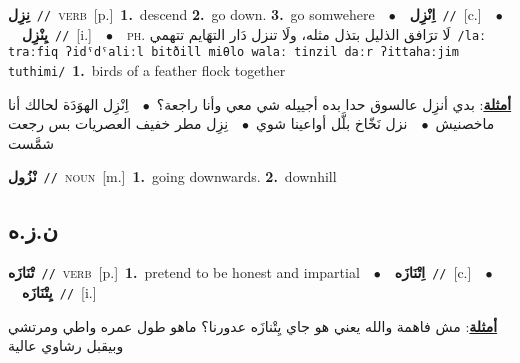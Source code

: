 \documentclass[10pt,a4paper,twoside]{article} %
\begin{document}
\begin{multicols}{2}
{\setlength\topsep{0pt}\textbf{\foreignlanguage{arabic}{نِزِل}}\ {\color{gray}\texttt{//}\color{black}}\ \textsc{verb}\ [p.]\ \textbf{1.}~descend  \textbf{2.}~go down.  \textbf{3.}~go somwehere\ \ $\bullet$\ \ \setlength\topsep{0pt}\textbf{\foreignlanguage{arabic}{اِنْزِل}}\ {\color{gray}\texttt{//}\color{black}}\ [c.]\ \ $\bullet$\ \ \setlength\topsep{0pt}\textbf{\foreignlanguage{arabic}{يِنْزِل}}\ {\color{gray}\texttt{//}\color{black}}\ [i.]\ \ $\bullet$\ \ \textsc{ph.} \color{gray} \foreignlanguage{arabic}{لَا ترَافق الذليل بتذل مثله، ولَا تنزل دَار التهَايم تتهمي}\color{black}\ {\color{gray}\texttt{/{\sffamily laː traːfiq ʔidˤdˤaliːl bitðill miθlo walaː tinzil daːr ʔittahaːjim tuthimi}/}\color{black}}\ \textbf{1.}~birds of a feather flock together\  \begin{flushright}\color{gray}\foreignlanguage{arabic}{\textbf{\underline{\foreignlanguage{arabic}{أمثلة}}}: بدي أنزِل عالسوق حدا بده أجييله شي معي وأنا راجعة؟\ $\bullet$\ \  اِنْزِل الهوَدَة لحالك أنا ماخصنيش\ $\bullet$\ \  نزل نَخّاخ بلَّل أواعينا شوي\ $\bullet$\ \  نِزِل مطر خفيف العصريات بس رجعت شمَّست}\end{flushright}\color{black}} \vspace{2mm}

{\setlength\topsep{0pt}\textbf{\foreignlanguage{arabic}{نْزُول}}\ {\color{gray}\texttt{//}\color{black}}\ \textsc{noun}\ [m.]\ \textbf{1.}~going downwards.  \textbf{2.}~downhill\ } \vspace{2mm}

\vspace{-3mm}
\subsection*{\color{blue}\foreignlanguage{arabic}{ن.ز.ه}\color{blue}{}} 

{\setlength\topsep{0pt}\textbf{\foreignlanguage{arabic}{تْنَازَه}}\ {\color{gray}\texttt{//}\color{black}}\ \textsc{verb}\ [p.]\ \textbf{1.}~pretend to be honest and impartial\ \ $\bullet$\ \ \setlength\topsep{0pt}\textbf{\foreignlanguage{arabic}{اِتْنَازَه}}\ {\color{gray}\texttt{//}\color{black}}\ [c.]\ \ $\bullet$\ \ \setlength\topsep{0pt}\textbf{\foreignlanguage{arabic}{يِتْنَازَه}}\ {\color{gray}\texttt{//}\color{black}}\ [i.]\  \begin{flushright}\color{gray}\foreignlanguage{arabic}{\textbf{\underline{\foreignlanguage{arabic}{أمثلة}}}: مش فاهمة والله يعني هو جاي يِتْنازَه عدورنا؟ ماهو طول عمره واطي ومرتشي وبيقبل رشاوي عالية}\end{flushright}\color{black}} \vspace{2mm}


\end{multicols}
\end{document}
